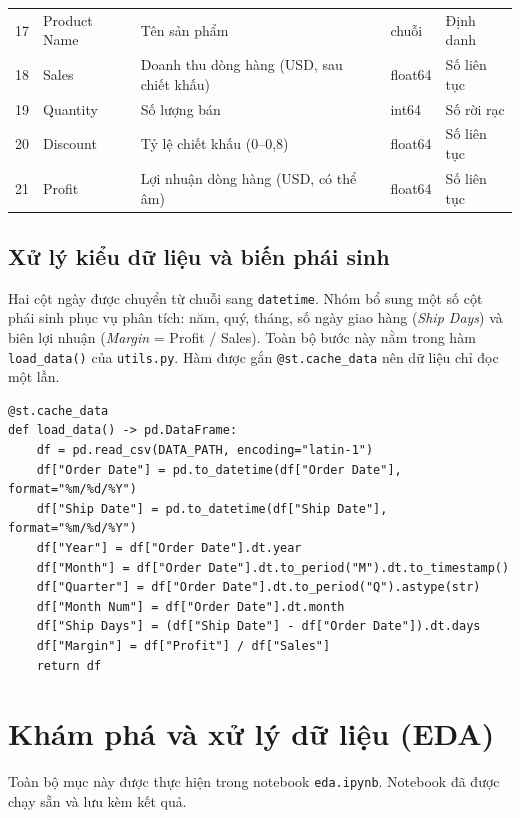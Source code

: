 \documentclass[12pt,a4paper]{article}
\begin{document}
\begin{longtable}{@{}r l p{5.6cm} l l@{}}
17 & Product Name  & Tên sản phẩm                         & chuỗi   & Định danh \\
18 & Sales         & Doanh thu dòng hàng (USD, sau chiết khấu) & float64 & Số liên tục \\
19 & Quantity      & Số lượng bán                         & int64   & Số rời rạc \\
20 & Discount      & Tỷ lệ chiết khấu (0–0,8)             & float64 & Số liên tục \\
21 & Profit        & Lợi nhuận dòng hàng (USD, có thể âm) & float64 & Số liên tục \\
\bottomrule
\end{longtable}

\subsection{Xử lý kiểu dữ liệu và biến phái sinh}
Hai cột ngày được chuyển từ chuỗi sang \texttt{datetime}. Nhóm bổ sung một số cột phái sinh phục vụ
phân tích: năm, quý, tháng, số ngày giao hàng (\textit{Ship Days}) và biên lợi nhuận
(\textit{Margin} = Profit / Sales). Toàn bộ bước này nằm trong hàm \texttt{load\_data()} của
\texttt{utils.py}. Hàm được gắn \texttt{@st.cache\_data} nên dữ liệu chỉ đọc một lần.
\begin{Verbatim}
@st.cache_data
def load_data() -> pd.DataFrame:
    df = pd.read_csv(DATA_PATH, encoding="latin-1")
    df["Order Date"] = pd.to_datetime(df["Order Date"], format="%m/%d/%Y")
    df["Ship Date"] = pd.to_datetime(df["Ship Date"], format="%m/%d/%Y")
    df["Year"] = df["Order Date"].dt.year
    df["Month"] = df["Order Date"].dt.to_period("M").dt.to_timestamp()
    df["Quarter"] = df["Order Date"].dt.to_period("Q").astype(str)
    df["Month Num"] = df["Order Date"].dt.month
    df["Ship Days"] = (df["Ship Date"] - df["Order Date"]).dt.days
    df["Margin"] = df["Profit"] / df["Sales"]
    return df
\end{Verbatim}

\section{Khám phá và xử lý dữ liệu (EDA)}
Toàn bộ mục này được thực hiện trong notebook \texttt{eda.ipynb}. Notebook đã được chạy sẵn và lưu kèm kết quả.
\end{document}
